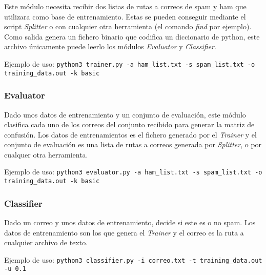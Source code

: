 Este módulo necesita recibir dos listas de rutas a correos de spam y ham que
utilizara como base de entrenamiento. Estas se pueden conseguir mediante el
script \textit{Splitter} o con cualquier otra herramienta (el comando
\textit{find} por ejemplo). Como salida genera un fichero binario que codifica
un diccionario de python, este archivo únicamente puede leerlo los módulos
\textit{Evaluator} y \textit{Classifier}.

Ejemplo de uso: \texttt{python3 trainer.py -a ham\_list.txt -s spam\_list.txt -o training\_data.out -k basic}

\subsubsection{Evaluator}

Dado unos datos de entrenamiento y un conjunto de evaluación, este módulo
clasifica cada uno de los correos del conjunto recibido para generar la matriz
de confusión. Los datos de entrenamientos es el fichero generado por el
\textit{Trainer} y el conjunto de evaluación es una lista de rutas a correos
generada por \textit{Splitter}, o por cualquer otra herramienta.

Ejemplo de uso\helpfn: \texttt{python3 evaluator.py -a ham\_list.txt -s spam\_list.txt -o training\_data.out -k basic}

\subsubsection{Classifier}

Dado un correo y unos datos de entrenamiento, decide si este es o no spam. Los
datos de entrenamiento son los que genera el \textit{Trainer} y el correo es
la ruta a cualquier archivo de texto.

Ejemplo de uso\helpfn: \texttt{python3 classifier.py -i correo.txt -t training\_data.out -u 0.1}
